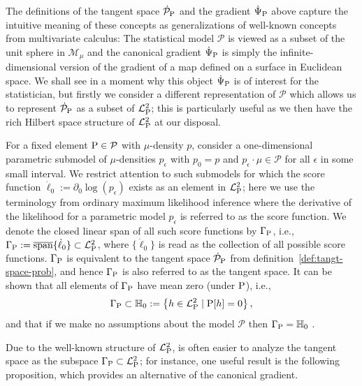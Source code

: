 \documentclass[a4,danish]{article}
\begin{document}
The definitions of the tangent space $\dot{\mathcal{P}}_{\P}$ and the gradient $\dot{\TT}_{\P}$
above capture the intuitive meaning of these concepts as generalizations of well-known concepts from
multivariate calculus: The statistical model $\mathcal{P}$ is viewed as a subset of the unit sphere
in $\mathcal{M}_{\mu}$ and the canonical gradient $\dot{\TT}_{\P}$ is simply the
infinite-dimensional version of the gradient of a map defined on a surface in Euclidean space. We
shall see in a moment why this object $\dot{\TT}_{\P}$ is of interest for the statistician, but
firstly we consider a different representation of $\mathcal{P}$ which allows us to represent
$\dot{\mathcal{P}}_{\P}$ as a subset of $\lp$; this is particularly useful as we then
have the rich Hilbert space structure of $\lp$ at our disposal.

For a fixed element $\P \in \mathcal{P}$ with $\mu$-density $p$, consider a one-dimensional
parametric submodel of $\mu$-densities $p_{\epsilon}$ with $p_0=p$ and
$p_{\epsilon} \cdot \mu \in \mathcal{P}$ for all $\epsilon$ in some small interval. We restrict
attention to such submodels for which the score function
$\dot{\ell}_0 := \partial_0{\log(p_{\epsilon})}$ exists as an element in $\lp$; here we use the
terminology from ordinary maximum likelihood inference where the derivative of the likelihood for a
parametric model $p_{\epsilon}$ is referred to as the score function. We denote the closed linear
span of all such score functions by $\Gamma_{\P}$, i.e.,
$\Gamma_{\P} := \overline{\mathrm{span}}\{\dot{\ell}_0\} \subset \lp$, where $\{\dot{\ell}_0\}$ is
read as the collection of all possible score functions. 
$\Gamma_{\P}$ is equivalent to the tangent space $\dot{\mathcal{P}}_{\P}$ from
definition~\ref{def:tangt-space-prob}, and hence $\Gamma_{\P}$ is also referred to as the tangent
space. It can be shown that all elements of $\Gamma_{\P}$ have mean zero (under $\P$), i.e.,
\begin{equation*}
  \Gamma_{\P} \subset \mathbb{H}_0 := 
  \left\{
    h \in \lp \mid \P[h] = 0
  \right\}, 
\end{equation*}
and that if we make no assumptions about the model $\mathcal{P}$ then $\Gamma_{\P} = \mathbb{H}_0$
.

Due to the well-known structure of $\lp$, is often easier to analyze the tangent space as the
subspace $\Gamma_{\P} \subset \lp$; for instance, one useful result is the following proposition,
which provides an alternative  of the canonical gradient.
\end{document}
